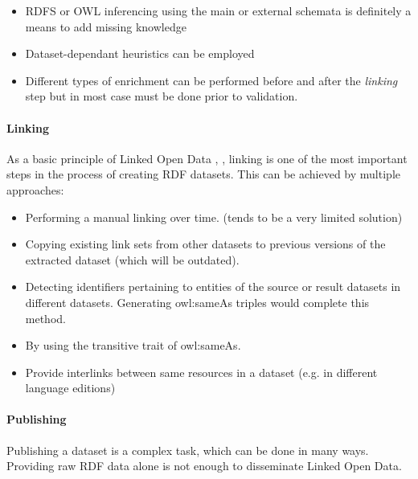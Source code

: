 \documentclass[a4paper,english,twoside,BCOR1.5cm,headsepline,DIV12,appendixprefix,final,12pt]{scrbook}
\def\emph{\textit}
\begin{document}
\begin{itemize}
\itemsep0em 
\item RDFS or OWL inferencing using the main or external schemata is definitely a means to add missing knowledge
\item Dataset-dependant heuristics can be employed
\item Different types of enrichment can be performed before and after the \emph{linking} step but in most case must be done prior to validation.
\end{itemize}


\vspace{-1.5em}
\paragraph{Linking}
As a basic principle of Linked Open Data \cite{5starData},
, linking is one of the most important steps in the process of creating RDF datasets.
This can be achieved by multiple approaches:

\begin{itemize}
\itemsep0em 
\item{Performing a manual linking over time. (tends to be a very limited solution)}
\item{Copying existing link sets from other datasets to previous versions of the extracted dataset (which will be outdated).}
\item{Detecting identifiers pertaining to entities of the source or result datasets in different datasets. Generating owl:sameAs triples would complete this method.}
\item By using the transitive trait of owl:sameAs.%
\item{Provide interlinks between same resources in a dataset (e.g. in different language editions)}
\end{itemize}

\vspace{-1.5em}
\paragraph{Publishing}
Publishing a dataset is a complex task, which can be done in many ways. 
Providing raw RDF data alone is not enough to disseminate Linked Open Data.
\end{document}

